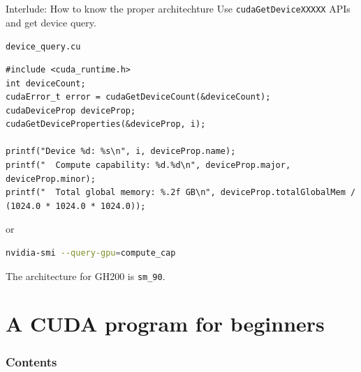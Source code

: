 \documentclass[dvipdfmx, 11pt, aspectratio=169]{beamer}   %
\begin{document}
\begin{frame}[fragile]{Interlude: How to know the proper architechture}
  Use \lstinline|cudaGetDeviceXXXXX| APIs and get device query.
  \begin{block}{\lstinline|device_query.cu|}
    \begin{lstlisting}[language=CUDA]
#include <cuda_runtime.h>
int deviceCount;
cudaError_t error = cudaGetDeviceCount(&deviceCount);
cudaDeviceProp deviceProp;
cudaGetDeviceProperties(&deviceProp, i);
      
printf("Device %d: %s\n", i, deviceProp.name);
printf("  Compute capability: %d.%d\n", deviceProp.major, deviceProp.minor);
printf("  Total global memory: %.2f GB\n", deviceProp.totalGlobalMem / (1024.0 * 1024.0 * 1024.0));
\end{lstlisting}
  \end{block}\vspace{-\baselineskip}
  or \vspace{-1.5\baselineskip}
  \begin{block}{}
    \begin{lstlisting}[language=bash]
  nvidia-smi --query-gpu=compute_cap
\end{lstlisting}
  \end{block}\vspace{-\baselineskip}
  The architecture for GH200 is \lstinline|sm_90|.
\end{frame}
\section{A CUDA program for beginners}
\begin{frame}
    \frametitle{Contents}
    \linespread{0.6}\selectfont
\end{frame}
\end{document}
